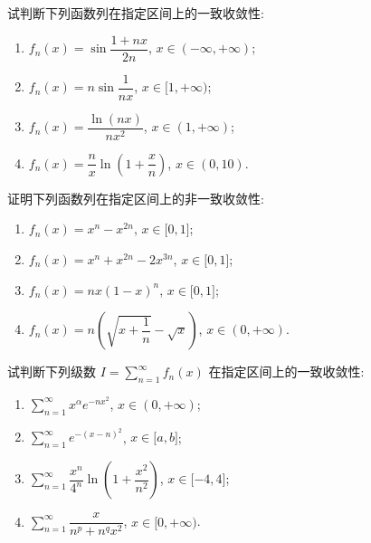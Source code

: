 \documentclass[../数学分析培优讲义.tex]{subfiles}
\begin{document}
\begin{example}
试判断下列函数列在指定区间上的一致收敛性:
\begin{enumerate}[label=(\arabic*)]
    \item $f_n(x)=\sin\dfrac{1+nx}{2n}$, $x\in(-\infty,+\infty)$;
    \item $f_n(x)=n\sin\dfrac{1}{nx}$, $x\in\lbrack 1,+\infty)$;
    \item $f_n(x)=\dfrac{\ln(nx)}{nx^2}$, $x\in(1,+\infty)$;
    \item $f_n(x)=\dfrac{n}{x}\ln\left(1+\dfrac{x}{n}\right)$, $x\in(0,10)$.
\end{enumerate}
\end{example}
\exampleblank

\begin{example}
证明下列函数列在指定区间上的非一致收敛性:
\begin{enumerate}[label=(\arabic*)]
    \item $f_n(x)=x^n-x^{2n}$, $x\in\lbrack 0,1\rbrack$;
    \item $f_n(x)=x^n+x^{2n}-2x^{3n}$, $x\in\lbrack 0,1\rbrack$;
    \item $f_n(x)=nx(1-x)^n$, $x\in\lbrack 0,1\rbrack$;
    \item $f_n(x)=n\left(\sqrt{x+\dfrac{1}{n}}-\sqrt{x}\right)$, $x\in(0,+\infty)$.
\end{enumerate}
\end{example}
\exampleblank

\begin{example}
试判断下列级数 $\displaystyle I=\sum\limits_{n=1}^{\infty}f_n(x)$ 在指定区间上的一致收敛性:
\begin{enumerate}[label=(\arabic*)]
    \item $\displaystyle\sum\limits_{n=1}^{\infty}x^\alpha e^{-nx^2}$, $x\in(0,+\infty)$;
    \item $\displaystyle\sum\limits_{n=1}^{\infty}e^{-(x-n)^2}$, $x\in\lbrack a,b\rbrack$;
    \item $\displaystyle\sum\limits_{n=1}^{\infty}\dfrac{x^n}{4^n}\ln\left(1+\dfrac{x^2}{n^2}\right)$, $x\in\lbrack -4,4\rbrack$;
    \item $\displaystyle\sum\limits_{n=1}^{\infty}\dfrac{x}{n^p+n^q x^2}$, $x\in\lbrack 0,+\infty)$.
\end{enumerate}
\end{example}
\exampleblank
\end{document}
